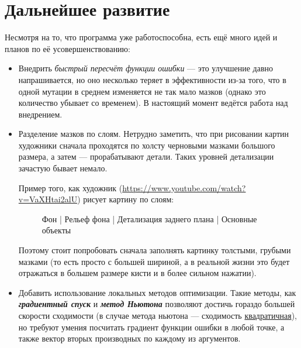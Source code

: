 \documentclass[11pt]{article}
\begin{document}
    \section{Дальнейшее развитие}\label{sec:todo}
    Несмотря на то, что программа уже работоспособна, есть ещё много идей и планов по её усовершенствованию:
    \begin{itemize}
        \item Внедрить \textit{быстрый пересчёт функции ошибки} — это улучшение давно напрашивается,
                но оно несколько теряет в эффективности из-за того, что в одной мутации в среднем изменяется
                не так мало мазков (однако это количество убывает со временем).
                В настоящий момент ведётся работа над внедрением.
        \item Разделение мазков по слоям.
                Нетрудно заметить, что при рисовании картин художники сначала проходятся по холсту черновыми мазками большого размера, а затем — прорабатывают детали.
                Таких уровней детализации зачастую бывает немало.

        Пример того, как художник (\href{https://www.youtube.com/watch?v=VaXHtai2alU}{https://www.youtube.com/watch?v=VaXHtai2alU}) рисует картину по слоям:


        \begin{figure}
            \centering
            \caption{ Фон | Рельеф фона | Детализация заднего плана | Основные объекты}
            \label{fig:layered_painting}
        \end{figure}


                Поэтому стоит попробовать сначала заполнять картинку толстыми, грубыми мазками
                (то есть просто с большей шириной, а в реальной жизни это будет отражаться в большем размере кисти и в более сильном нажатии).
        \item Добавить использование локальных методов оптимизации.
                Такие методы, как \textbf\textit{{градиентный спуск}} и \textbf\textit{{метод Ньютона}} позволяют достичь гораздо большей скорости сходимости
                (в случае метода ньютона — сходимость \href{http://w.ict.nsc.ru/books/textbooks/akhmerov/mo_unicode/4.html}{квадратичная}),
                но требуют умения посчитать градиент функции ошибки в любой точке, а также вектор вторых производных по каждому из аргументов.


\end{itemize}
\end{document}
